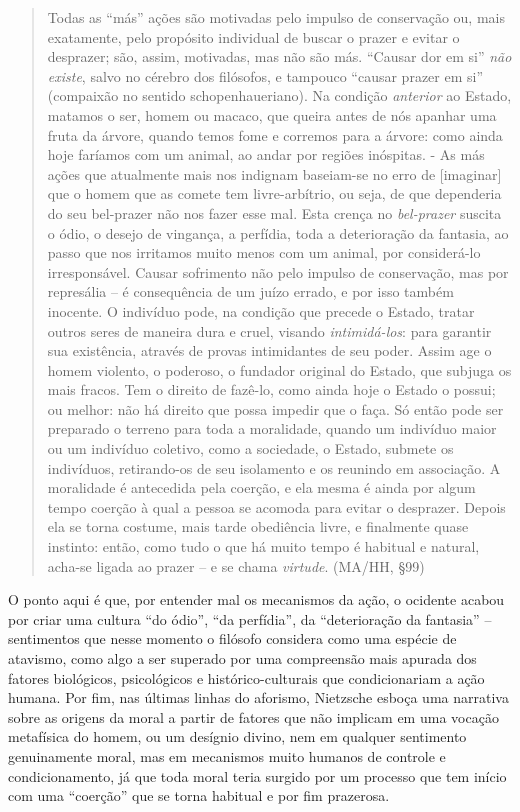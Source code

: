 \documentclass[
	12pt,				%
	openright,			%
	oneside,			%
	a4paper,			%
	english,			%
	french,				%
	spanish,			%
	brazil				%
	]{abntex2}
\begin{document}
\begin{quotation}
Todas as “más” ações são motivadas pelo impulso de conservação ou, mais exatamente, pelo propósito individual de buscar o prazer e evitar o desprazer; são, assim, motivadas, mas não são más. “Causar dor em si” \textit{não existe}, salvo no cérebro dos filósofos, e tampouco “causar prazer em si” (compaixão no sentido schopenhaueriano). Na condição \textit{anterior} ao Estado, matamos o ser, homem ou macaco, que queira antes de nós apanhar uma fruta da árvore, quando temos fome e corremos para a árvore: como ainda hoje faríamos com um animal, ao andar por regiões inóspitas. - As más ações que atualmente mais nos indignam baseiam-se no erro de [imaginar] que o homem que as comete tem livre-arbítrio, ou seja, de que dependeria do seu bel-prazer não nos fazer esse mal. Esta crença no \textit{bel-prazer} suscita o ódio, o desejo de vingança, a perfídia, toda a deterioração da fantasia, ao passo que nos irritamos muito menos com um animal, por considerá-lo irresponsável. Causar sofrimento não pelo impulso de conservação, mas por represália – é consequência de um juízo errado, e por isso também inocente. O indivíduo pode, na condição que precede o Estado, tratar outros seres de maneira dura e cruel, visando \textit{intimidá-los}: para garantir sua existência, através de provas intimidantes de seu poder. Assim age o homem violento, o poderoso, o fundador original do Estado, que subjuga os mais fracos. Tem o direito de fazê-lo, como ainda hoje o Estado o possui; ou melhor: não há direito que possa impedir que o faça. Só então pode ser preparado o terreno para toda a moralidade, quando um indivíduo maior ou um indivíduo coletivo, como a sociedade, o Estado, submete os indivíduos, retirando-os de seu isolamento e os reunindo em associação. A moralidade é antecedida pela coerção, e ela mesma é ainda por algum tempo coerção à qual a pessoa se acomoda para evitar o desprazer. Depois ela se torna costume, mais tarde obediência livre, e finalmente quase instinto: então, como tudo o que há muito tempo é habitual e natural, acha-se ligada ao prazer – e se chama \textit{virtude}. (MA/HH, §99)
\end{quotation}

O ponto aqui é que, por entender mal os mecanismos da ação, o ocidente acabou por criar uma cultura “do ódio”, “da perfídia”, da “deterioração da fantasia” – sentimentos que nesse momento o filósofo considera como uma espécie de atavismo, como algo a ser superado por uma compreensão mais apurada dos fatores biológicos, psicológicos e histórico-culturais que condicionariam a ação humana. Por fim, nas últimas linhas do aforismo, Nietzsche esboça uma narrativa sobre as origens da moral a partir de fatores que não implicam em uma vocação metafísica do homem, ou um desígnio divino, nem em qualquer sentimento genuinamente moral, mas em mecanismos muito humanos de controle e condicionamento, já que toda moral teria surgido por um processo que tem início com uma “coerção” que se torna habitual e por fim prazerosa.
\end{document}
